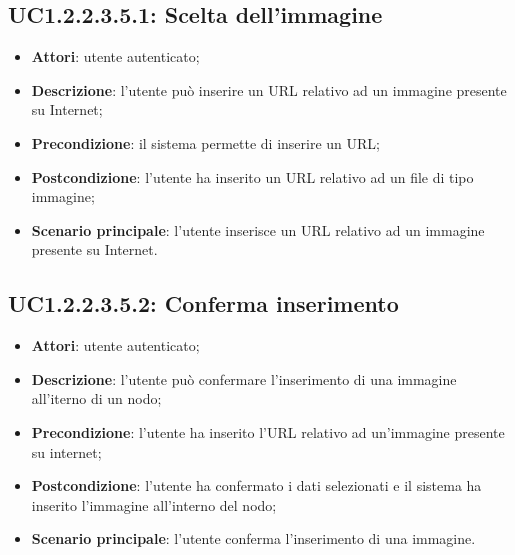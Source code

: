 \subsection{UC1.2.2.3.5.1: Scelta dell'immagine}
\label{UC1.2.2.3.5.1}
\begin{itemize}
\item \textbf{Attori}: utente autenticato;
\item \textbf{Descrizione}: l'utente può inserire un URL relativo ad un immagine presente su Internet;
\item \textbf{Precondizione}: il sistema permette di inserire un URL;
\item \textbf{Postcondizione}: l'utente ha inserito un URL relativo ad un file di tipo immagine;
\item \textbf{Scenario principale}:
l'utente inserisce un URL relativo ad un immagine presente su Internet.
\end{itemize}
\subsection{UC1.2.2.3.5.2: Conferma inserimento}
\label{UC1.2.2.3.5.2}
\begin{itemize}
\item \textbf{Attori}: utente autenticato;
\item \textbf{Descrizione}: l'utente può confermare l'inserimento di una immagine all'iterno di un nodo;
\item \textbf{Precondizione}: l'utente ha inserito l'URL relativo ad un'immagine presente su internet;
\item \textbf{Postcondizione}: l'utente ha confermato i dati selezionati e il sistema ha inserito l'immagine all'interno del nodo;
\item \textbf{Scenario principale}:
l'utente conferma l'inserimento di una immagine.
\end{itemize}
